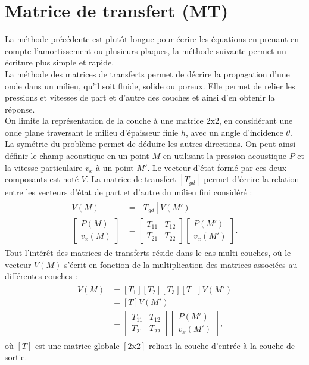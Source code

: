 \documentclass[12pt,foolscap]{report}
\begin{document}
	\section{Matrice de transfert (MT)}
	La méthode précédente est plutôt longue pour écrire les équations en prenant en compte l'amortissement ou plusieurs plaques, la méthode suivante permet un écriture plus simple et rapide.\\ 
	La méthode des matrices de transferts permet de décrire la propagation d'une onde dans un milieu, qu'il soit fluide, solide ou poreux. Elle permet de relier les pressions et vitesses de part et d'autre des couches et ainsi d'en obtenir  la réponse.\\
	On limite la représentation de la couche à une matrice $2\text{x}2$, en considérant une onde plane traversant le milieu d'épaisseur finie $h$, avec un angle d'incidence $\theta$.\\
	La symétrie du problème permet de déduire les autres directions. On peut ainsi définir le champ acoustique en un point $M$ en utilisant la pression acoustique $P$ et la vitesse particulaire $v_x$ à un point $M'$. Le vecteur d'état formé par ces deux composants est noté $V$.  La matrice de transfert $[T_{gd}]$
	permet d'écrire la relation  entre les vecteurs d'état de part et d'autre du milieu fini considéré :
	\begin{align}
	\begin{split}
	V(M)&=[T_{gd}]V(M')\\
	\begin{bmatrix}
	P(M)\\v_x(M)
	\end{bmatrix}&=
	\begin{bmatrix}
	T_{11} &T_{12}\\
	T_{21} &T_{22}
	\end{bmatrix}
	\begin{bmatrix}
	P(M')\\v_x(M')
	\end{bmatrix}\text{.}
	\end{split}
	\end{align}  
	Tout l'intérêt des matrices de transferts réside dans le cas multi-couches, où le  vecteur $V(M)$ s'écrit en fonction de la multiplication des matrices associées au différentes couches :
	\begin{align}
	\begin{split}
	V(M)&=[T_{1}][T_{2}][T_{3}][T_{\dots}]V(M')\\
	&=[T]V(M')\\&=
	\begin{bmatrix}
	T_{11} &T_{12}\\
	T_{21} &T_{22}
	\end{bmatrix}
	\begin{bmatrix}
	P(M')\\v_x(M')
	\end{bmatrix}\text{,}
	\end{split}
	\end{align}  
	où $[T]$ est une matrice globale $[2\text{x}2]$ reliant la couche d'entrée à la couche de sortie.
\end{document}
